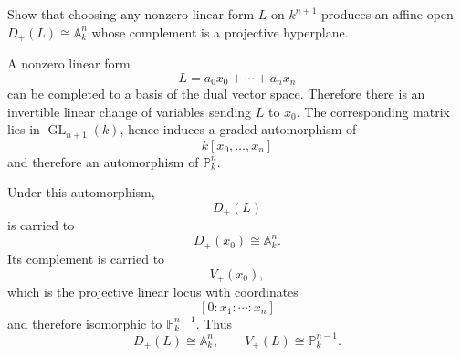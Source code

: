 \begin{problem}\label{prob:vi36-03}
Show that choosing any nonzero linear form \(L\) on \(k^{n+1}\) produces an affine open \(D_+(L)\cong\mathbb A^n_k\) whose complement is a projective hyperplane.
\end{problem}

\ifdefined\FullProblemDossiers
\begin{solution}
A nonzero linear form
\[
L=a_0x_0+\cdots+a_nx_n
\]
can be completed to a basis of the dual vector space. Therefore there is an invertible linear change of variables
sending \(L\) to \(x_0\). The corresponding matrix lies in \(\operatorname{GL}_{n+1}(k)\), hence induces a graded
automorphism of
\[
k[x_0,\ldots,x_n]
\]
and therefore an automorphism of \(\mathbb P^n_k\).

Under this automorphism,
\[
D_+(L)
\]
is carried to
\[
D_+(x_0)\cong\mathbb A^n_k.
\]
Its complement is carried to
\[
V_+(x_0),
\]
which is the projective linear locus with coordinates
\[
[0:x_1:\cdots:x_n]
\]
and therefore isomorphic to \(\mathbb P^{n-1}_k\). Thus
\[
\boxed{
D_+(L)\cong\mathbb A^n_k,
\qquad
V_+(L)\cong\mathbb P^{n-1}_k.
}
\]
\end{solution}
\fi

